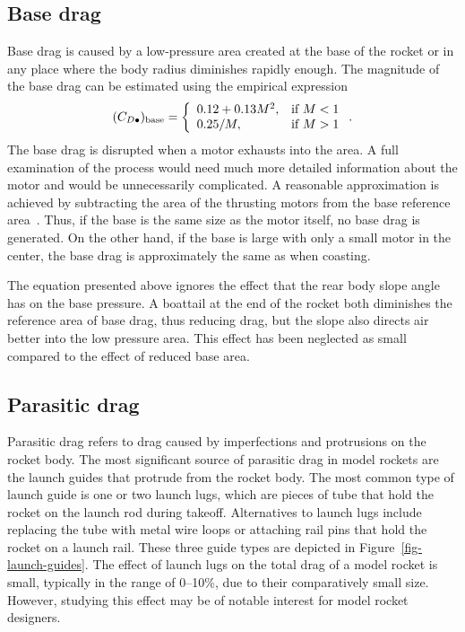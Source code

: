 




\subsection{Base drag}
\label{sec-base-drag}

Base drag is caused by a low-pressure area created at the base of the
rocket or in any place where the body radius diminishes rapidly
enough.  The magnitude of the base drag can be estimated using the
empirical expression~\cite[p.~23]{fleeman}
%
\begin{equation}
(C_{D\bullet})_{\rm base} = 
  \left\{ 
\begin{array}{ll}
  0.12+0.13M^2, & \mbox{if $M<1$} \\
  0.25/M,         & \mbox{if $M>1$}
\end{array}
  \right. .
\label{eq-base-drag}
\end{equation}
%
The base drag is disrupted when a motor exhausts into the area.  A
full examination of the process would need much more detailed
information about the motor and would be unnecessarily complicated.  A
reasonable approximation is achieved by subtracting the area of the
thrusting motors from the base reference area~\cite[p.~23]{fleeman}.
Thus, if the base is the same size as the motor itself, no base drag
is generated.  On the other hand, if the base is large with only a
small motor in the center, the base drag is approximately the same as
when coasting.

The equation presented above ignores the effect that the rear body
slope angle has on the base pressure.  A boattail at the end of the
rocket both diminishes the reference area of base drag, thus reducing
drag, but the slope also directs air better into the low pressure
area. This effect has been neglected as small compared to the effect
of reduced base area.









\subsection{Parasitic drag}

Parasitic drag refers to drag caused by imperfections and protrusions
on the rocket body.  The most significant source of parasitic drag in
model rockets are the launch guides that protrude from the rocket
body.  The most common type of launch guide is one or two launch lugs,
which are pieces of tube that hold the rocket on the launch rod during
takeoff.  Alternatives to launch lugs include replacing the tube with
metal wire loops or attaching rail pins that hold the rocket on a
launch rail.  These three guide types are depicted in
Figure~\ref{fig-launch-guides}.  The effect of launch lugs on the
total drag of a model rocket is small, typically in the range of
0--10\%, due to their comparatively small size.  However, studying
this effect may be of notable interest for model rocket designers.



